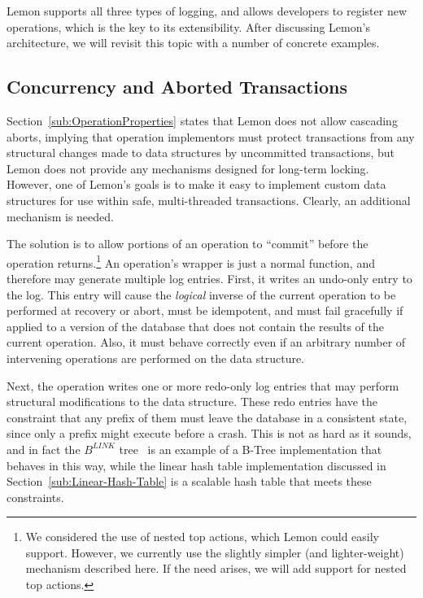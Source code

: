 \documentclass[letterpaper,twocolumn,english]{article}
\newcommand{\yad}{Lemon\xspace}
\begin{document}
\yad supports all three types of logging, and allows developers to
register new operations, which is the key to its extensibility. After
discussing \yad's architecture, we will revisit this topic with a number of
concrete examples.


\subsection{Concurrency and Aborted Transactions}


Section~\ref{sub:OperationProperties} states that \yad does not
allow cascading aborts, implying that operation implementors must
protect transactions from any structural changes made to data structures
by uncommitted transactions, but \yad does not provide any mechanisms
designed for long-term locking. However, one of \yad's goals is to
make it easy to implement custom data structures for use within safe,
multi-threaded transactions. Clearly, an additional mechanism is needed.

The solution is to allow portions of an operation to ``commit'' before
the operation returns.\footnote{We considered the use of nested top actions, which \yad could easily
support. However, we currently use the slightly simpler (and lighter-weight)
mechanism described here. If the need arises, we will add support
for nested top actions.}
An operation's wrapper is just a normal function, and therefore may
generate multiple log entries. First, it writes an undo-only entry
to the log. This entry will cause the \emph{logical} inverse of the
current operation to be performed at recovery or abort, must be idempotent,
and must fail gracefully if applied to a version of the database that
does not contain the results of the current operation. Also, it must
behave correctly even if an arbitrary number of intervening operations
are performed on the data structure.

Next, the operation writes one or more redo-only log entries that may perform structural
modifications to the data structure. These redo entries have the constraint that any prefix of them must leave the database in a consistent state, since only a prefix might execute before a crash.  This is not as hard as it sounds, and in fact the
$B^{LINK}$ tree~\cite{blink} is an example of a B-Tree implementation
that behaves in this way, while the linear hash table implementation
discussed in Section~\ref{sub:Linear-Hash-Table} is a scalable 
hash table that meets these constraints.
\end{document}
